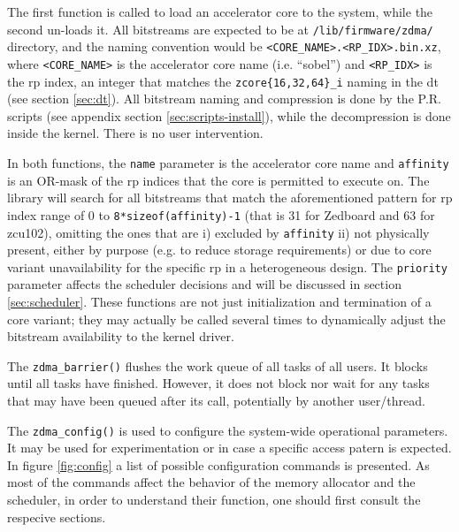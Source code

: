 The first function is called to load an accelerator core to the system, while
the second un-loads it.
All bitstreams are expected to be at \texttt{/lib/firmware/zdma/} directory,
and the naming convention would be \texttt{<CORE\_NAME>.<RP\_IDX>.bin.xz},
where \texttt{<CORE\_NAME>} is the accelerator core name (i.e. ``sobel'')
and \texttt{<RP\_IDX>} is the \gls{rp} index, an integer that matches
the \texttt{zcore\{16,32,64\}\_i} naming in the \gls{dt} (see section \ref{sec:dt}).
All bitstream naming and compression is done by the P.R. scripts (see appendix section \ref{sec:scripts-install}),
while the decompression is done inside the kernel. There is no user intervention.

In both functions, the \texttt{name} parameter is the accelerator core name and 
\texttt{affinity} is an OR-mask of the \gls{rp} indices that the core is permitted to execute on.
The library will search for all bitstreams that match the aforementioned pattern for 
\gls{rp} index range of 0 to \texttt{8*sizeof(affinity)-1} (that is 31 for Zedboard and 63 for zcu102),
omitting the ones that are i) excluded by \texttt{affinity} ii) not physically present,
either by purpose (e.g. to reduce storage requirements) or due to core variant unavailability for
the specific \gls{rp} in a heterogeneous design. The \texttt{priority} parameter affects
the scheduler decisions and will be discussed in section \ref{sec:scheduler}.
These functions are not just initialization and termination of a core variant; they may
actually be called several times to dynamically adjust the bitstream availability to the kernel driver.

The \texttt{zdma\_barrier()} flushes the work queue of all tasks of all users.
It blocks until all tasks have finished. However, it does not block nor wait for any
tasks that may have been queued after its call, potentially by another user/thread.

The \texttt{zdma\_config()} is used to configure the system-wide operational parameters.
It may be used for experimentation or in case a specific access patern is expected. 
In figure \ref{fig:config} a list of possible configuration commands is presented.
As most of the commands affect the behavior of the memory allocator and the scheduler,
in order to understand their function,
one should first consult the respecive sections.

